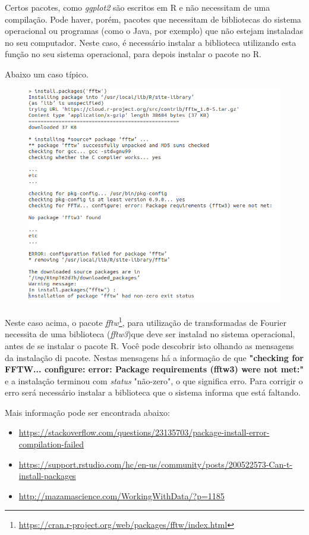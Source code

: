 \documentclass[12pt,a4paper,oneside]{erdc}
\begin{document}
Certos pacotes, como \textit{ggplot2} são escritos em R e não necessitam de uma compilação. Pode haver, porém, pacotes que necessitam de bibliotecas do sistema operacional ou programas (como o Java, por exemplo) que não estejam instaladas no seu computador. Neste caso, é necessário instalar a biblioteca utilizando esta função no seu sistema operacional, para depois instalar o pacote no R.

Abaixo um caso típico.


\begin{figure}
	\centering
	\includegraphics[width=0.7\linewidth]{../figs/erro_R}
	\caption{}
	\label{fig:error}
\end{figure}



Neste caso acima, o pacote \textit{fftw}\footnote{\url{https://cran.r-project.org/web/packages/fftw/index.html}}, para utilização de transformadas de Fourier necessita de uma biblioteca (\textit{fftw3})que deve ser instalad no sistema operacional, antes de se instalar o pacote R. Você pode descobrir isto olhando as mensagens da instalação di pacote. Nestas mensagens há a informação de que \textbf{"checking for FFTW... configure: error: Package requirements (fftw3) were not met:"} e a instalação terminou com \textit{status} "não-zero", o que significa erro. Para corrigir o erro será necessário instalar a biblioteca que o sistema informa que está faltando.

Mais informação pode ser encontrada abaixo:

\begin{itemize}
	\item \url{https://stackoverflow.com/questions/23135703/package-install-error-compilation-failed}
	
	\item \url{https://support.rstudio.com/hc/en-us/community/posts/200522573-Can-t-install-packages}
	
	\item \url{http://mazamascience.com/WorkingWithData/?p=1185}
	
\end{itemize}
 
\end{document}
